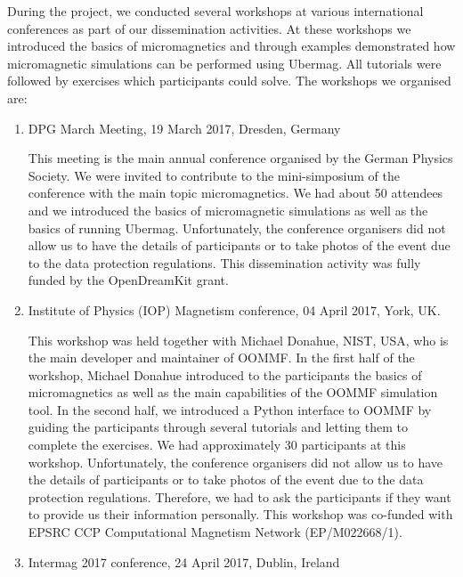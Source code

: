 \documentclass{deliverablereport}
\begin{document}
During the project, we conducted several workshops at various
international conferences as part of our dissemination activities. At
these workshops we introduced the basics of micromagnetics and through
examples demonstrated how micromagnetic simulations can be performed
using Ubermag. All tutorials were followed by exercises which
participants could solve. The workshops we organised are:

\begin{enumerate}

\item DPG March Meeting, 19 March 2017, Dresden, Germany

  This meeting is the main annual conference organised by the German
  Physics Society. We were invited to contribute to the mini-simposium
  of the conference with the main topic micromagnetics. We had about
  50 attendees and we introduced the basics of micromagnetic
  simulations as well as the basics of running Ubermag. Unfortunately,
  the conference organisers did not allow us to have the details of
  participants or to take photos of the event due to the data
  protection regulations. This dissemination activity was fully funded
  by the OpenDreamKit grant.

\item Institute of Physics (IOP) Magnetism conference, 04 April 2017,
York, UK.

  This workshop was held together with Michael Donahue, NIST, USA, who
is the main developer and maintainer of OOMMF. In the first half of
the workshop, Michael Donahue introduced to the participants the
basics of micromagnetics as well as the main capabilities of the OOMMF
simulation tool. In the second half, we introduced a Python interface
to OOMMF by guiding the participants through several tutorials and
letting them to complete the exercises. We had approximately 30
participants at this workshop. Unfortunately, the conference
organisers did not allow us to have the details of participants or to
take photos of the event due to the data protection
regulations. Therefore, we had to ask the participants if they want to
provide us their information personally. This workshop was co-funded
with EPSRC CCP Computational Magnetism Network (EP/M022668/1).

\item Intermag 2017 conference, 24 April 2017, Dublin, Ireland


\end{enumerate}
\end{document}
